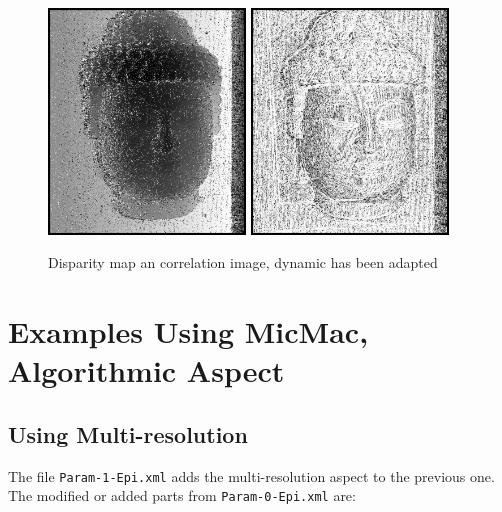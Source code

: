 \begin{figure}
\hspace{10 mm}
\includegraphics[height=60mm]{FIGS/Boudhas/Px1-Param0.jpg}
\hspace{10 mm}
\includegraphics[height=60mm]{FIGS/Boudhas/CorrelParam0.jpg}
\caption{Disparity map an correlation image, dynamic has been adapted}
\label{FIG:DISP:COR:BASIC}
\end{figure}


\section{Examples Using MicMac, Algorithmic Aspect}


\subsection{Using Multi-resolution}

\label{BASIC:MULRES}

The file {\tt Param-1-Epi.xml} adds the multi-resolution aspect 
to the previous one. The modified or added parts from
{\tt Param-0-Epi.xml} are:


